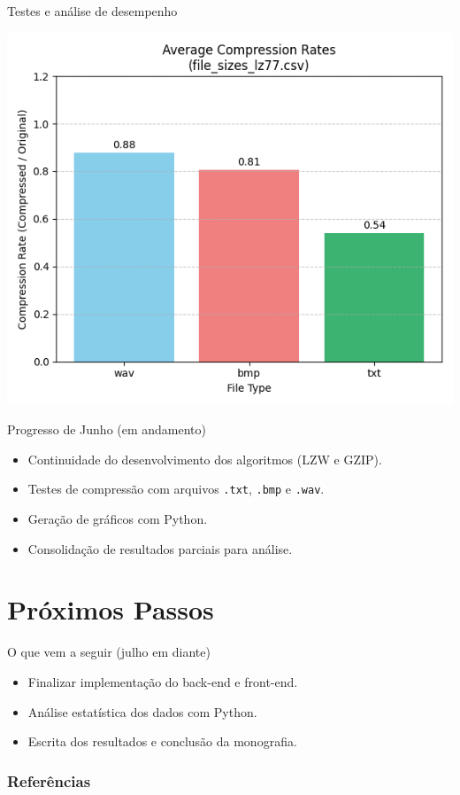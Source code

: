 \documentclass{beamer}
\begin{document}
\begin{frame}{Testes e análise de desempenho}
    \begin{center}
        \includegraphics[width=0.8\linewidth]{imagens/file_sizes_lz77_compression}
    \end{center}
\end{frame}

\appendix


\begin{frame}{Progresso de Junho (em andamento)}
    \begin{itemize}
        \item Continuidade do desenvolvimento dos algoritmos (LZW e GZIP).
        \item Testes de compress\~ao com arquivos \texttt{.txt}, \texttt{.bmp} e \texttt{.wav}.
        \item Geração de gráficos com Python.
        \item Consolida\c{c}\~ao de resultados parciais para an\'alise.
    \end{itemize}
\end{frame}

\section{Pr\'oximos Passos}
\begin{frame}{O que vem a seguir (julho em diante)}
    \begin{itemize}
        \item Finalizar implementa\c{c}\~ao do back-end e front-end.
        \item An\'alise estat\'istica dos dados com Python.
        \item Escrita dos resultados e conclus\~ao da monografia.
    \end{itemize}
\end{frame}

\begin{frame}
    \frametitle{Refer\^encias}
    \printbibliography
\end{frame}
\end{document}
